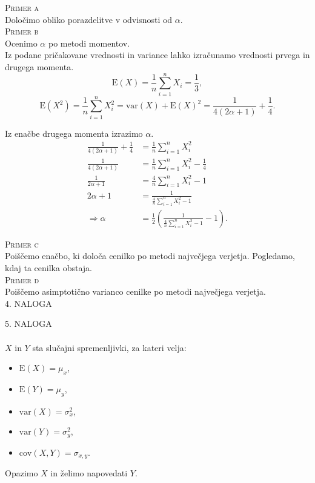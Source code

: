 \documentclass[a4paper,12pt]{article}
\begin{document}
\noindent
\textsc{Primer a}
\\
Določimo obliko porazdelitve v odvisnosti od $\alpha$.
\\

\noindent
\textsc{Primer b}
\\
Ocenimo $\alpha$ po metodi momentov.
\\
Iz podane pričakovane vrednosti in variance lahko izračunamo vrednosti prvega in drugega momenta.
$$ \text{E}(X) = \frac{1}{n} \sum_{i = 1}^{n} X_i = \frac{1}{3}, $$
$$ \text{E}(X^2) = \frac{1}{n} \sum_{i = 1}^{n} X_i^2 = \text{var}(X) + \text{E}(X)^2 = \frac{1}{4(2 \alpha + 1)} + \frac{1}{4}. $$

Iz enačbe drugega momenta izrazimo $\alpha$.
\begin{align*}
    \frac{1}{4(2 \alpha + 1)} + \frac{1}{4} &= \frac{1}{n} \sum_{i = 1}^{n} X_i^2 
    \\
    \frac{1}{4(2 \alpha + 1)} &= \frac{1}{n} \sum_{i = 1}^{n} X_i^2 - \frac{1}{4} 
    \\
    \frac{1}{2 \alpha + 1} &= \frac{4}{n} \sum_{i = 1}^{n} X_i^2 - 1 
    \\
    2 \alpha + 1 &= \frac{1}{\frac{4}{n} \sum_{i = 1}^{n} X_i^2 - 1}
    \\
    \Rightarrow \alpha &= \frac{1}{2} \left( \frac{1}{\frac{4}{n} \sum_{i = 1}^{n} X_i^2 - 1} - 1 \right).
\end{align*}

\noindent
\textsc{Primer c}
\\
Poiščemo enačbo, ki določa cenilko po metodi največjega verjetja. Pogledamo, kdaj ta cenilka obstaja.
\\

\noindent
\textsc{Primer d}
\\
Poiščemo asimptotično varianco cenilke po metodi največjega verjetja.
\\
 

\noindent
\textsc{\large{4. NALOGA}}


\noindent
\textsc{\large{5. NALOGA}}
\\
\\
$X$ in $Y$ sta slučajni spremenljivki, za kateri velja:
\begin{itemize} 
    \item $\text{E}(X) = \mu_x$,
    \item $\text{E}(Y) = \mu_y$,
    \item $\text{var}(X) = \sigma_x^2$,
    \item $\text{var}(Y) = \sigma_y^2$,
    \item $\text{cov}(X,Y) = \sigma_{x,y}$.
\end{itemize}
Opazimo $X$ in želimo napovedati $Y$. 
\\
\end{document}
